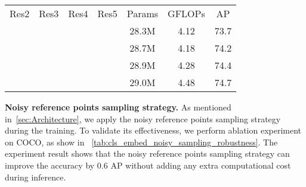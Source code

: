 \documentclass[runningheads]{llncs}
\newcommand{\cmark}{\ding{51}}\newcommand{\xmark}{\ding{55}}
\begin{document}
\begin{table*}[t]
\begin{center}
{\begin{tabular}{cccc|cc|c}
                    \hline
                    Res2\;        & Res3\;       & Res4\;       & Res5\;        & Params & GFLOPs   & {AP} \\
                    \Xhline{2\arrayrulewidth}
                                &            &            & \cmark & 28.3M & 4.12 & 73.7 \\
                                &            & \cmark & \cmark & 28.7M & 4.18 & 74.2 \\
                                & \cmark & \cmark & \cmark & 28.9M & 4.28 & 74.4 \\
                    \cmark & \cmark & \cmark & \cmark & 29.0M & 4.48 & 74.7 \\
                    \hline
                    \end{tabular}
		}
		\hspace{0.1em}
	\end{center}
\end{table*}
\setlength{\tabcolsep}{0.4pt}














\noindent\textbf{Noisy reference points sampling strategy.} As mentioned in~\cref{sec:Architecture}, we apply the noisy reference points sampling strategy during the training. To validate its effectiveness, we perform ablation experiment on COCO, as show in ~\cref{tab:cls_embed_noisy_sampling_robustness}. The experiment result shows that the noisy reference points sampling strategy can improve the accuracy by 0.6 AP without adding any extra computational cost during inference.
\end{document}

